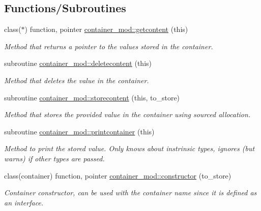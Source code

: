 \subsection*{Functions/\+Subroutines}
\begin{DoxyCompactItemize}
\item 
class($\ast$) function, pointer \mbox{\hyperlink{namespacecontainer__mod_a23a016e747d896622127c0c21dca9836}{container\+\_\+mod\+::getcontent}} (this)
\begin{DoxyCompactList}\small\item\em Method that returns a pointer to the values stored in the container. \end{DoxyCompactList}\item 
subroutine \mbox{\hyperlink{namespacecontainer__mod_a005e6cba51f5837a8bef1f05bb899c08}{container\+\_\+mod\+::deletecontent}} (this)
\begin{DoxyCompactList}\small\item\em Method that deletes the value in the container. \end{DoxyCompactList}\item 
subroutine \mbox{\hyperlink{namespacecontainer__mod_ace49cee012b6cd3c41c03556ab0dd884}{container\+\_\+mod\+::storecontent}} (this, to\+\_\+store)
\begin{DoxyCompactList}\small\item\em Method that stores the provided value in the container using sourced allocation. \end{DoxyCompactList}\item 
subroutine \mbox{\hyperlink{namespacecontainer__mod_abf1785185971a527e437d3a489462724}{container\+\_\+mod\+::printcontainer}} (this)
\begin{DoxyCompactList}\small\item\em Method to print the stored value. Only knows about instrinsic types, ignores (but warns) if other types are passed. \end{DoxyCompactList}\item 
class(container) function, pointer \mbox{\hyperlink{namespacecontainer__mod_a6262df4ff34024d566cf8261dc20a248}{container\+\_\+mod\+::constructor}} (to\+\_\+store)
\begin{DoxyCompactList}\small\item\em Container constructor, can be used with the \textquotesingle{}container\textquotesingle{} name since it is defined as an interface. \end{DoxyCompactList}\end{DoxyCompactItemize}

